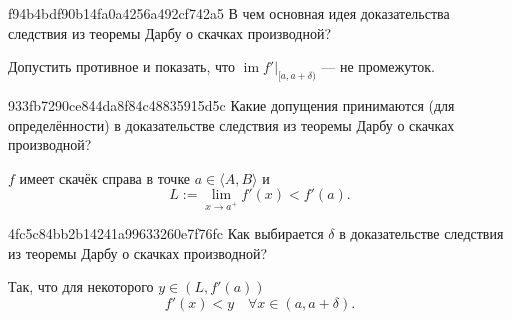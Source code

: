 
\begin{note}{f94b4bdf90b14fa0a4256a492cf742a5}
    В чем основная идея доказательства следствия из теоремы Дарбу о скачках производной?

    \begin{cloze}{1}
        Допустить противное и показать, что \({ \operatorname{im} f'|_{[a, a + \delta)} }\) --- не промежуток.
    \end{cloze}
\end{note}

\begin{note}{933fb7290ce844da8f84c48835915d5c}
    Какие допущения принимаются (для определённости) в доказательстве следствия из теоремы Дарбу о скачках производной?

    \begin{cloze}{1}
        \({ f }\) имеет скачёк справа в точке \({ a \in \langle A, B \rangle }\) и
        \[
            L := \lim_{x \to a^{+}} f'(x) < f'(a).
        \]
    \end{cloze}
\end{note}

\begin{note}{4fc5c84bb2b14241a99633260e7f76fc}
    Как выбирается \({ \delta }\) в доказательстве следствия из теоремы Дарбу о скачках производной?

    \begin{cloze}{1}
        Так, что для некоторого \({ y \in (L, f'(a)) }\)
        \[
            f'(x) < y \quad \forall x \in (a, a + \delta).
        \]
    \end{cloze}
\end{note}


